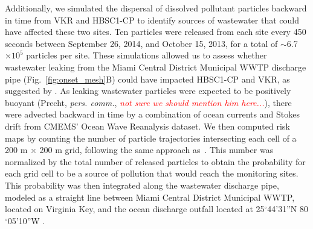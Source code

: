 \documentclass[preprint,12pt,authoryear]{elsarticle}
\newcommand{\emphc}[1]{\emph{\textcolor{red}{#1}}}
\begin{document}
Additionally, we simulated the dispersal of dissolved pollutant particles backward in time from VKR and HBSC1-CP to identify sources of wastewater that could have affected these two sites. Ten particles were released from each site every 450 seconds between September 26, 2014, and October 15, 2013, for a total of $\sim$6.7$\times10^5$ particles per site. These simulations allowed us to assess whether wastewater leaking from the Miami Central District Municipal WWTP discharge pipe (Fig.~\ref{fig:onset_mesh}B) could have impacted HBSC1-CP and VKR, as suggested by \cite{gintert2019regional}. As leaking wastewater particles were expected to be positively buoyant (Precht, \textit{pers. comm.}, \emphc{not sure we should mention him here...}), there were advected backward in time by a combination of ocean currents and Stokes drift from CMEMS' Ocean Wave Reanalysis dataset. We then computed risk maps by counting the number of particle trajectories intersecting each cell of a 200 m $\times$ 200 m grid, following the same approach as~\cite{anselain2023qatar}. This number was normalized by the total number of released particles to obtain the probability for each grid cell to be a source of pollution that would reach the monitoring sites.
This probability was then integrated along the wastewater discharge pipe, modeled as a straight line between Miami Central District Municipal WWTP, located on Virginia Key, and the ocean discharge outfall located at 25$^\circ$44'31''N 80$^\circ$05'10''W \citep{koopman2006ocean}.
\end{document}
